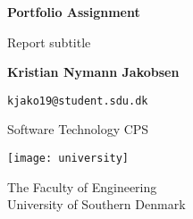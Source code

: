 \begin{titlepage}
    \begin{center}
        \vspace*{1cm}
        \textbf{Portfolio Assignment}
        \vspace{0.5cm}

        Report subtitle
        \vspace{1.5cm}

        \textbf{Kristian Nymann Jakobsen} 
        \vspace{0.5cm}

        \texttt{kjako19@student.sdu.dk}
        \vfill

        Software Technology CPS
        \vspace{0.8cm}

        \texttt{[image: university]}
        \vspace{0.5cm}

        The Faculty of Engineering \\
        University of Southern Denmark\\
        \date{\today}
    \end{center}
\end{titlepage}
